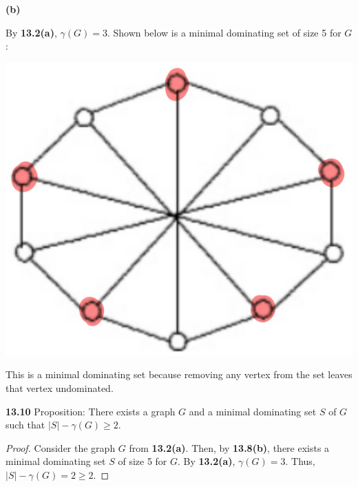 \documentclass[12pt]{article}
\begin{document}
\medskip\noindent\textbf{(b)}

    By \textbf{13.2(a)}, $\gamma(G) = 3$.
    Shown below is a minimal dominating set of size 5 for $G$:
    \begin{center} \includegraphics[scale=.4]{11.png} \end{center}
    This is a minimal dominating set because removing any vertex from the set leaves that vertex undominated.

\newpage\noindent\textbf{13.10} Proposition: There exists a graph $G$ and a minimal dominating set $S$ of $G$ such that $|S| - \gamma(G) \geq 2$.
\begin{proof}
    Consider the graph $G$ from \textbf{13.2(a)}.
    Then, by \textbf{13.8(b)}, there exists a minimal dominating set $S$ of size 5 for $G$.
    By \textbf{13.2(a)}, $\gamma(G) = 3$.
    Thus, $|S| - \gamma(G) = 2 \geq 2$.
\end{proof}
\end{document}

